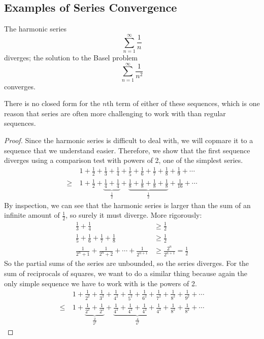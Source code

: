 \documentclass{article}
\begin{document}
	\subsection{Examples of Series Convergence}
	\begin{proposition}
		The harmonic series
		\[ \sum_{n=1}^\infty \frac 1 n \]
		diverges; the solution to the Basel problem
		\[ \sum_{n=1}^\infty \frac 1 {n^2} \]
		converges.
	\end{proposition}
	There is no closed form for the $n$th term of either of these sequences, which is one reason that series are often more challenging to work with than regular sequences.
	\begin{proof}
		Since the harmonic series is difficult to deal with, we will copmare it to a sequence that we understand easier. Therefore, we show that the first sequence diverges using a comparison test with powers of 2, one of the simplest series.
		\begin{align*}
			&1 + \frac 1 2 + \frac 1 3 + \frac 1 4 + \frac 1 5 + \frac 1 6 + \frac 1 7 + \frac 1 8 + \frac 1 9 + \cdots \\
			\geq\ &1 + \frac 1 2 + \underbrace{\frac 1 4 + \frac 1 4}_{\frac 1 2} + \underbrace{\frac 1 8 + \frac 1 8 + \frac 1 8 + \frac 1 8}_{\frac 1 2} + \frac 1 {16} + \cdots
		\end{align*}
		By inspection, we can see that the harmonic series is larger than the sum of an infinite amount of $\frac 1 2$, so surely it must diverge. More rigorously:
		\begin{align*}
			\frac 1 3 + \frac 1 4 &\geq \frac 1 2 \\
			\frac 1 5 + \frac 1 6 + \frac 1 7 + \frac 1 8 &\geq \frac 1 2 \\
			\frac{1}{2^n + 1} + \frac{1}{2^n + 2} + \cdots + \frac{1}{2^{n+1}} &\geq \frac{2^n}{2^{n+1}} = \frac{1}{2}
		\end{align*}
		So the partial sums of the series are unbounded, so the series diverges. For the sum of reciprocals of squares, we want to do a similar thing because again the only simple sequence we have to work with is the powers of 2.
		\begin{align*}
			&1 + \frac 1 {2^2} + \frac 1 {3^2} + \frac 1 {4^2} + \frac 1 {5^2} + \frac 1 {6^2} + \frac 1 {7^2} + \frac 1 {8^2} + \frac 1 {9^2} + \cdots \\
			\leq\ &1 + \underbrace{\frac 1 {2^2} + \frac 1 {2^2}}_{\frac 2 {2^2}} + \underbrace{\frac 1 {4^2} + \frac 1 {4^2} + \frac 1 {4^2} + \frac 1 {4^2}}_{\frac 4 {4^2}} + \frac 1 {8^2} + \frac 1 {8^2} + \cdots

\end{align*}
\end{proof}
\end{document}
